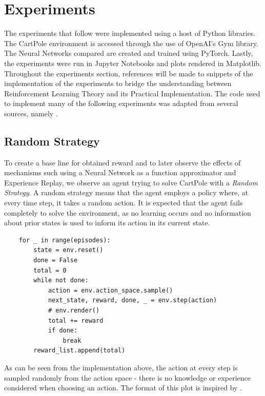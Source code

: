 \documentclass{article}
\begin{document}
\section{Experiments}

The experiments that follow were implemented using a host of Python libraries. The CartPole environment is accessed through the use of OpenAI's Gym library\cite{brockman2016openai}. The Neural Networks compared are created and trained using PyTorch\cite{NEURIPS2019_9015}. Lastly, the experiments were run in Jupyter Notebooks\cite{Kluyver2016jupyter} and plots rendered in Matplotlib\cite{Hunter:2007}. Throughout the experiments section, references will be made to snippets of the implementation of the experiments to bridge the understanding between Reinforcement Learning Theory and its Practical Implementation. The code used to implement many of the following experiments was adapted from several sources, namely \cite{mnih2013atari}\cite{ritakurban}.



\subsection{Random Strategy}

To create a base line for obtained reward and to later observe the effects of mechanisms such using a Neural Network as a function approximator and Experience Replay, we observe an agent trying to solve CartPole with a \textit{Random Strategy}. A random strategy means that the agent employs a policy where, at every time step, it takes a random action. It is expected that the agent fails completely to solve the environment, as no learning occurs and no information about prior states is used to inform its action in its current state. 


\begin{verbatim}
    for _ in range(episodes):
        state = env.reset()
        done = False
        total = 0
        while not done:
            action = env.action_space.sample()
            next_state, reward, done, _ = env.step(action)
            # env.render()
            total += reward
            if done:
                break
        reward_list.append(total)
\end{verbatim}

As can be seen from the implementation above, the action at every step is sampled randomly from the action space - there is no knowledge or experience considered when choosing an action. The format of this plot is inspired by \cite{ritakurban}.
\end{document}
